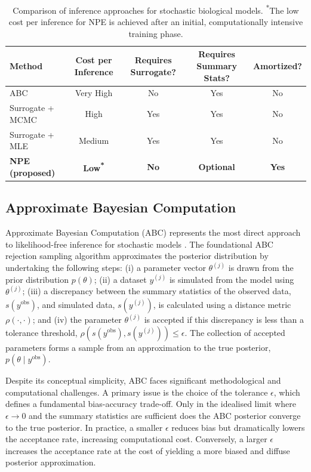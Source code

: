 \documentclass{article}
\begin{document}
\begin{table}[htbp]
	\centering
	\renewcommand{\arraystretch}{1.3} %
	\begin{tabular}{@{}lcccc@{}}
		\toprule
		\textbf{Method} & \textbf{Cost per Inference} & \textbf{Requires Surrogate?} & \textbf{Requires Summary Stats?} & \textbf{Amortized?} \\
		\midrule
		ABC & Very High & No & Yes & No \\
		Surrogate + MCMC & High & Yes & Yes & No \\
		Surrogate + MLE & Medium & Yes & Yes & No \\
		\textbf{NPE (proposed)} & \textbf{Low\textsuperscript{*}} & \textbf{No} & \textbf{Optional} & \textbf{Yes} \\
		\bottomrule
	\end{tabular}
	\vspace{0.2cm}
	\caption{Comparison of inference approaches for stochastic biological models. \textsuperscript{*}The low cost per inference for NPE is achieved after an initial, computationally intensive training phase.}
	\label{tab:method_comparison}
\end{table}





\subsection{Approximate Bayesian Computation}

Approximate Bayesian Computation (ABC)  represents the most direct approach to likelihood-free inference for stochastic models  \citep{SunnkerABC,Sisson2018}. The foundational ABC rejection sampling algorithm approximates the posterior distribution by undertaking the following steps: (i) a parameter vector $\theta^{(j)}$ is drawn from the prior distribution $p(\theta)$; (ii) a dataset $y^{(j)}$ is simulated from the model using $\theta^{(j)}$; (iii) a discrepancy between the summary statistics of the observed data, $s(y^{\text{obs}})$, and simulated data, $s(y^{(j)})$, is calculated using a distance metric $\rho(\cdot, \cdot)$; and (iv) the parameter $\theta^{(j)}$ is accepted if this discrepancy is less than a tolerance threshold, $\rho(s(y^{\text{obs}}), s(y^{(j)})) \le \epsilon$. The collection of accepted parameters forms a sample from an approximation to the true posterior, $p(\theta \mid y^{\text{obs}})$.


Despite its conceptual simplicity, ABC faces significant methodological and computational challenges. A primary issue is the choice of the tolerance $\epsilon$, which defines a fundamental bias-accuracy trade-off. Only in the idealised limit where $\epsilon \to 0$ and the summary statistics are sufficient does the ABC posterior converge to the true posterior. In practice, a smaller $\epsilon$ reduces bias but dramatically lowers the acceptance rate, increasing computational cost. Conversely, a larger $\epsilon$ increases the acceptance rate at the cost of yielding a more biased and diffuse posterior approximation. 
\end{document}
